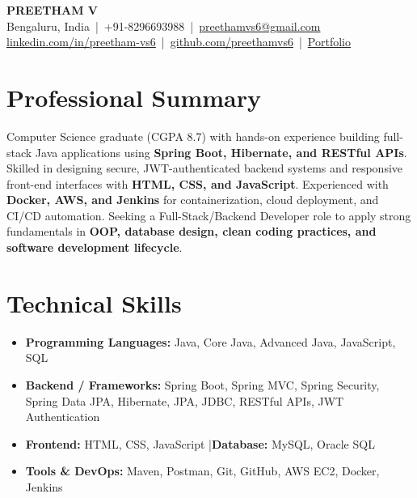 \documentclass[9.5pt,a4paper]{article}
\begin{document}
\begin{center}
    {\LARGE \textbf{PREETHAM V}}\\[2pt]
    \small Bengaluru, India \,|\, +91-8296693988 \,|\, 
    \href{mailto:preethamvs6@gmail.com}{preethamvs6@gmail.com}\\
    \href{https://www.linkedin.com/in/preetham-vs6}{linkedin.com/in/preetham-vs6}
    \,|\, 
    \href{https://github.com/preethamvs6}{github.com/preethamvs6}
    \,|\, 
    \href{https://preethamv.vercel.app}{Portfolio}
\end{center}
\vspace{-3pt}

\section{Professional Summary}
Computer Science graduate (CGPA 8.7) with hands-on experience building full-stack Java applications using \textbf{Spring Boot, Hibernate, and RESTful APIs}. Skilled in designing secure, JWT-authenticated backend systems and responsive front-end interfaces with \textbf{HTML, CSS, and JavaScript}. Experienced with \textbf{Docker, AWS, and Jenkins} for containerization, cloud deployment, and CI/CD automation. Seeking a Full-Stack/Backend Developer role to apply strong fundamentals in \textbf{OOP, database design, clean coding practices, and software development lifecycle}.

\section{Technical Skills}
\begin{itemize}[leftmargin=1.1em]
    \item \textbf{Programming Languages:} Java, Core Java, Advanced Java, JavaScript, SQL
    \item \textbf{Backend / Frameworks:} Spring Boot, Spring MVC, Spring Security, Spring Data JPA, Hibernate, JPA, JDBC, RESTful APIs, JWT Authentication
    \item \textbf{Frontend:} HTML, CSS, JavaScript \quad|\quad \textbf{Database:} MySQL, Oracle SQL
    \item \textbf{Tools \& DevOps:} Maven, Postman, Git, GitHub, AWS EC2, Docker, Jenkins
\end{itemize}

\end{document}
